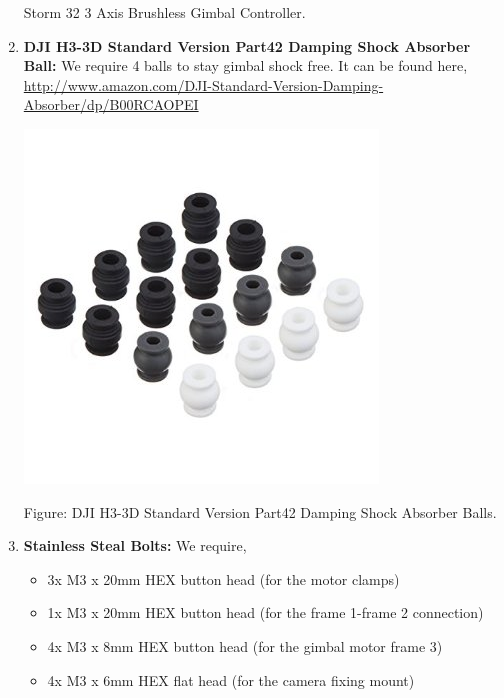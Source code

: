 \documentclass[11pt,a4paper]{article}
\begin{document}
\begin{enumerate}
\begin{center}
			\end{center}
			\begin{center}
				Storm 32 3 Axis Brushless Gimbal Controller.
			\end{center}
			\item \textbf{DJI H3-3D Standard Version Part42 Damping Shock Absorber Ball:} We require 4 balls to stay gimbal shock free. It can be found here,
			\newline
			\url{http://www.amazon.com/DJI-Standard-Version-Damping-Absorber/dp/B00RCAOPEI} 
			\begin{center}
				\includegraphics[scale=0.5]{Shock_Absorber_Balls.jpg}
			\end{center}
			\begin{center}
				Figure: DJI H3-3D Standard Version Part42 Damping Shock Absorber Balls.
			\end{center}
			\item \textbf{Stainless Steal Bolts:} We require,
			\begin{itemize}
				\item 3x M3 x 20mm HEX button head (for the motor clamps)
				\item 1x M3 x 20mm HEX button head (for the frame 1-frame 2 connection)
				\item 4x M3 x 8mm HEX button head (for the gimbal motor frame 3)
				\item 4x M3 x 6mm HEX flat head (for the camera fixing mount)
			\end{itemize}
		\end{enumerate}
\end{document}
